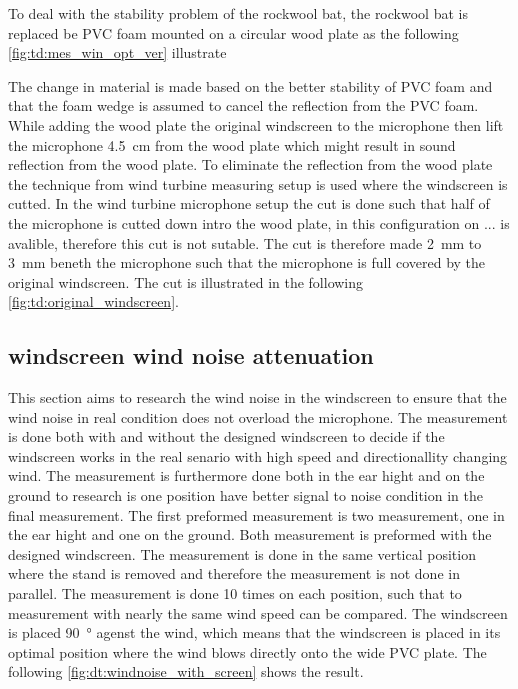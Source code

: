 To deal with the stability problem of the rockwool bat, the rockwool bat is replaced be PVC foam mounted on a circular wood plate as the following \autoref{fig:td:mes_win_opt_ver} illustrate


The change in material is made based on the better stability of PVC foam and that the foam wedge is assumed to cancel the reflection from the PVC foam. While adding the wood plate the original windscreen to the microphone then lift the microphone \SI{4.5}{\centi\meter} from the wood plate which might result in sound reflection from the wood plate. To eliminate the reflection from the wood plate the technique from wind turbine measuring setup is used where the windscreen is cutted. In the wind turbine microphone setup the cut is done such that half of the microphone is cutted down intro the wood plate, in this configuration on ... is avalible, therefore this cut is not sutable. The cut is therefore made \SI{2}{\milli\meter} to \SI{3}{\milli\meter} beneth the microphone such that the microphone is full covered by the original windscreen. The cut is illustrated in the following \autoref{fig:td:original_windscreen}. 






\subsection{windscreen wind noise attenuation}\label{sec:ds:wind_noi_att}
This section aims to research the wind noise in the windscreen to ensure that the wind noise in real condition does not overload the microphone. The measurement is done both with and without the designed windscreen to decide if the windscreen works in the real senario with high speed and directionallity changing wind. The measurement is furthermore done both in the ear hight and on the ground to research is one position have better signal to noise condition in the final measurement. The first preformed measurement is two measurement, one in the ear hight and one on the ground. Both measurement is preformed with the designed windscreen. The measurement is done in the same vertical position where the stand is removed and therefore the measurement is not done in parallel. The measurement is done 10 times on each position, such that to measurement with nearly the same wind speed can be compared. The windscreen is placed \SI{90}{\degree} agenst the wind, which means that the windscreen is placed in its optimal position where the wind blows directly onto the wide PVC plate. The following \autoref{fig:dt:windnoise_with_screen} shows the result.

